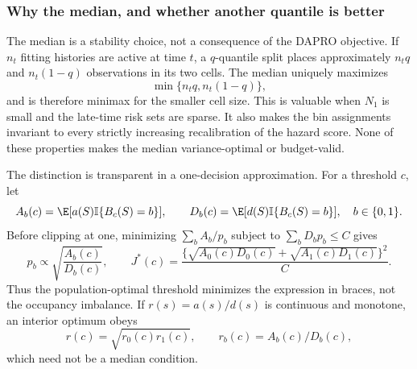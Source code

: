 \subsubsection{Why the median, and whether another quantile is better}
\label{sec:k2bc_cutpoint}

The median is a stability choice, not a consequence of the DAPRO objective.
If $n_t$ fitting histories are active at time $t$, a $q$-quantile split
places approximately $n_tq$ and $n_t(1-q)$ observations in its two cells.
The median uniquely maximizes
\begin{equation}
    \min\{n_tq,n_t(1-q)\},
\end{equation}
and is therefore minimax for the smaller cell size.  This is valuable when
$N_1$ is small and the late-time risk sets are sparse.  It also makes the bin
assignments invariant to every strictly increasing recalibration of the
hazard score.  None of these properties makes the median variance-optimal or
budget-valid.

The distinction is transparent in a one-decision approximation.  For a
threshold $c$, let
\begin{equation}
 A_b(c)=\E[a(S)\mathbb{I}\{B_c(S)=b\}],\qquad
 D_b(c)=\E[d(S)\mathbb{I}\{B_c(S)=b\}],\quad b\in\{0,1\}.
\end{equation}
Before clipping at one, minimizing $\sum_bA_b/p_b$ subject to
$\sum_bD_bp_b\leq C$ gives
\begin{equation}
 p_b\propto\sqrt{\frac{A_b(c)}{D_b(c)}},
 \qquad
 J^*(c)=\frac{
  \{\sqrt{A_0(c)D_0(c)}+\sqrt{A_1(c)D_1(c)}\}^2}{C}.
 \label{eq:k2bc_optimal_cut}
\end{equation}
Thus the population-optimal threshold minimizes the expression in braces,
not the occupancy imbalance.  If $r(s)=a(s)/d(s)$ is continuous and monotone,
an interior optimum obeys
\begin{equation}
 r(c)=\sqrt{r_0(c)r_1(c)},
 \qquad r_b(c)=A_b(c)/D_b(c),
\end{equation}
which need not be a median condition.

